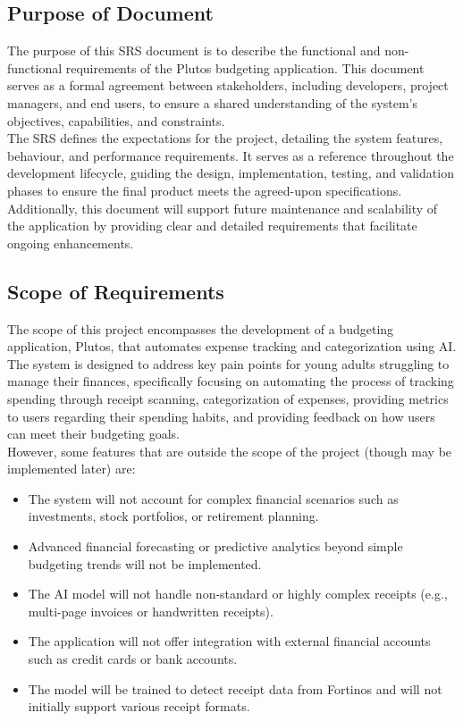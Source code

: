 \documentclass[12pt]{article}
\begin{document}
\subsection{Purpose of Document}

The purpose of this SRS document is to describe the functional and non-functional requirements of the Plutos budgeting application. This document serves as a formal agreement between stakeholders, including developers, project managers, and end users, to ensure a shared understanding of the system's objectives, capabilities, and constraints. \\

\noindent The SRS defines the expectations for the project, detailing the system features, behaviour, and performance requirements. It serves as a reference throughout the development lifecycle, guiding the design, implementation, testing, and validation phases to ensure the final product meets the agreed-upon specifications. Additionally, this document will support future maintenance and scalability of the application by providing clear and detailed requirements that facilitate ongoing enhancements.

\subsection{Scope of Requirements} 

The scope of this project encompasses the development of a budgeting application, Plutos, that automates expense tracking 
and categorization using AI. The system is designed to address key pain points for young adults struggling to manage their 
finances, specifically focusing on automating the process of tracking spending through receipt scanning, categorization of 
expenses, providing metrics to users regarding their spending habits, and providing feedback on how users can meet their 
budgeting goals.\\

\noindent However, some features that are outside the scope of the project (though may be implemented later) are: 

\begin{itemize}
  \item The system will not account for complex financial scenarios such as investments, stock portfolios, or retirement planning.
  \item Advanced financial forecasting or predictive analytics beyond simple budgeting trends will not be implemented.
  \item The AI model will not handle non-standard or highly complex receipts (e.g., multi-page invoices or handwritten receipts).
  \item The application will not offer integration with external financial accounts such as credit cards or bank accounts.
  \item The model will be trained to detect receipt data from Fortinos and will not initially support various receipt formats.
\end{itemize}
\end{document}
